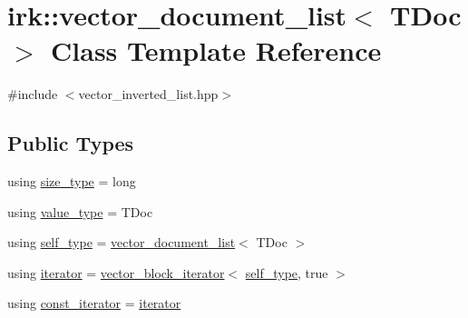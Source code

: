 \hypertarget{classirk_1_1vector__document__list}{}\section{irk\+:\+:vector\+\_\+document\+\_\+list$<$ T\+Doc $>$ Class Template Reference}
\label{classirk_1_1vector__document__list}


{\ttfamily \#include $<$vector\+\_\+inverted\+\_\+list.\+hpp$>$}

\subsection*{Public Types}
\begin{DoxyCompactItemize}
\item 
using \mbox{\hyperlink{classirk_1_1vector__document__list_ac9387bd9f5dc89b638b6295858a9268c}{size\+\_\+type}} = long
\item 
using \mbox{\hyperlink{classirk_1_1vector__document__list_a0ec9c56f5e12a3a9101b5a18b2fbe69f}{value\+\_\+type}} = T\+Doc
\item 
using \mbox{\hyperlink{classirk_1_1vector__document__list_a8c83c7819e9ffcbb4162d3ee9f41d76a}{self\+\_\+type}} = \mbox{\hyperlink{classirk_1_1vector__document__list}{vector\+\_\+document\+\_\+list}}$<$ T\+Doc $>$
\item 
using \mbox{\hyperlink{classirk_1_1vector__document__list_a42499af78a7d66a1b626858cd424600f}{iterator}} = \mbox{\hyperlink{classirk_1_1vector__block__iterator}{vector\+\_\+block\+\_\+iterator}}$<$ \mbox{\hyperlink{classirk_1_1vector__document__list_a8c83c7819e9ffcbb4162d3ee9f41d76a}{self\+\_\+type}}, true $>$
\item 
using \mbox{\hyperlink{classirk_1_1vector__document__list_a91539ec8ebd87cd47957107df90744aa}{const\+\_\+iterator}} = \mbox{\hyperlink{classirk_1_1vector__document__list_a42499af78a7d66a1b626858cd424600f}{iterator}}
\end{DoxyCompactItemize}
